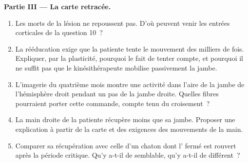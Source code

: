 \begin{problem}
\medskip
\noindent\textbf{Partie III --- La carte retracée.}
\begin{enumerate}[resume]
  \item Les  morts de la lésion ne repoussent pas. D'où
        peuvent venir les entrées corticales de la question 10~?
  \item La rééducation exige que la patiente tente le mouvement des
        milliers de fois. Expliquer, par la plasticité, pourquoi le
        fait de tenter compte, et pourquoi il ne suffit pas que le
        kinésithérapeute mobilise passivement la jambe.
  \item L'imagerie du quatrième mois montre une activité dans l'aire
        de la jambe de l'hémisphère droit pendant un pas de la jambe
        droite. Quelles fibres pourraient porter cette commande,
        compte tenu du croisement~?
  \item La main droite de la patiente récupère moins que sa jambe.
        Proposer une explication à partir de la carte et des exigences
        des mouvements de la main.
  \item Comparer sa récupération avec celle d'un chaton dont l'
        fermé est rouvert après la période critique. Qu'y a-t-il de
        semblable, qu'y a-t-il de différent~?
\end{enumerate}


\end{problem}
